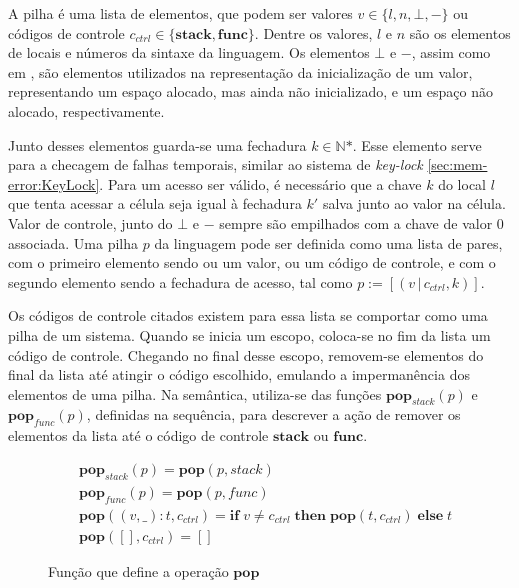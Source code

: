 A pilha é uma lista de elementos, que podem ser valores $v \in \{l, n, \bot, -\}$ ou códigos de controle $c_{ctrl} \in \{\mathbf{stack},\mathbf{func}\}$. Dentre os valores, $l$ e $n$ são os elementos de locais e números da sintaxe da linguagem. Os elementos $\bot$ e $-$, assim como em \citet{WESSEL2019}, são elementos utilizados na representação da inicialização de um valor, representando um espaço alocado, mas ainda não inicializado, e um espaço não alocado, respectivamente. 

Junto desses elementos guarda-se uma fechadura $k \in \mathbb{N}\text{*}$. Esse elemento serve para a checagem de falhas temporais, similar ao sistema de \emph{key-lock} \ref{sec:mem-error:KeyLock}. Para um acesso ser válido, é necessário que a chave $k$ do local $l$ que tenta acessar a célula seja igual à fechadura $k'$ salva junto ao valor na célula. Valor de controle, junto do $\bot$ e $-$ sempre são empilhados com a chave de valor 0 associada. Uma pilha $p$ da linguagem pode ser definida como uma lista de pares, com o primeiro elemento sendo ou um valor, ou um código de controle, e com o segundo elemento sendo a fechadura de acesso, tal como $p := [(v\,|\,c_{ctrl}, k)]$.

Os códigos de controle citados existem para essa lista se comportar como uma pilha de um sistema. Quando se inicia um escopo, coloca-se no fim da lista um código de controle. Chegando no final desse escopo, removem-se elementos do final da lista até atingir o código escolhido, emulando a impermanência dos elementos de uma pilha. Na semântica, utiliza-se das funções $\mathbf{pop}_{stack}(p)$ e $\mathbf{pop}_{func}(p)$, definidas na sequência, para descrever a ação de remover os elementos da lista até o código de controle $\mathbf{stack}$ ou $\mathbf{func}$. 

\begin{figure}[ht]
	\begin{align}
		&\mathbf{pop}_{stack}(p) = \mathbf{pop}(p, stack) \label{fig:def:pop1}\\
		&\mathbf{pop}_{func}(p) = \mathbf{pop}(p, func) \label{fig:def:pop2}\\
		&\mathbf{pop}((v, \_) : t, c_{ctrl}) = \mathbf{if} \; v \neq c_{ctrl} \;\mathbf{then} \; \mathbf{pop}(t, c_{ctrl}) \; \mathbf{else} \; t  \label{fig:def:pop3}\\
		&\mathbf{pop}([], c_{ctrl}) =  [] \label{fig:def:pop4}
	\end{align}
	\caption{Função que define a operação $\mathbf{pop}$}
	\label{fig:def:pop}
\end{figure}

